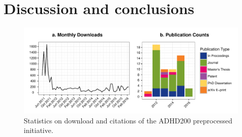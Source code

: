\documentclass[preprint,12pt,3p]{elsarticle}
\begin{document}
\section{Discussion and conclusions}

\begin{figure}[!t]
\begin{center}
  \includegraphics[]{impact_stats}
  \caption{Statistics on download and citations of the ADHD200 preprocessed initiative.}
  \label{fig:usage}
\end{center}
\end{figure}
\end{document}
